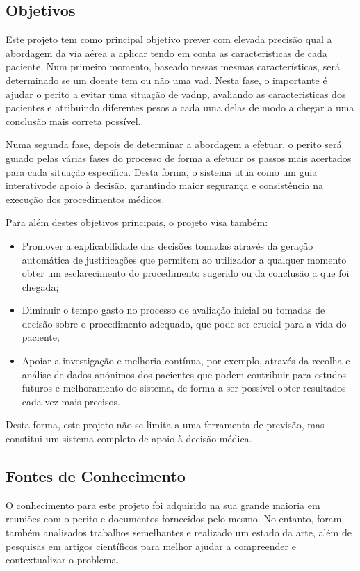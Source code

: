 \documentclass[a4paper,12pt,twoside]{article}
\begin{document}
    \subsection{Objetivos}
    Este projeto tem como principal objetivo prever com elevada precisão qual a abordagem da via aérea a aplicar tendo em conta as caracteristicas de cada paciente. Num primeiro momento, baseado nessas mesmas características, será determinado se um doente tem ou não uma \gls{vad}. Nesta fase, o importante é ajudar o perito a evitar uma situação de \gls{vadnp}, avaliando as caracteristicas dos pacientes e atribuindo diferentes pesos a cada uma delas de modo a chegar a uma conclusão mais correta possível.
    
    Numa segunda fase, depois de determinar a abordagem a efetuar, o perito será guiado pelas várias fases do processo de forma a efetuar os passos mais acertados para cada situação específica. Desta forma, o sistema atua como um guia interativode apoio à decisão, garantindo maior segurança e consistência na execução dos procedimentos médicos.

    Para além destes objetivos principais, o projeto visa também:
    \begin{itemize}
        \item Promover a explicabilidade das decisões tomadas através da geração automática de justificações que permitem ao utilizador a qualquer momento obter um esclarecimento do procedimento sugerido ou da conclusão a que foi chegada;
        \item Diminuir o tempo gasto no processo de avaliação inicial ou tomadas de decisão sobre o procedimento adequado, que pode ser crucial para a vida do paciente;
        \item Apoiar a investigação e melhoria contínua, por exemplo, através da recolha e análise de dados anónimos dos pacientes que podem contribuir para estudos futuros e melhoramento do sistema, de forma a ser possível obter resultados cada vez mais precisos.
    \end{itemize}

    Desta forma, este projeto não se limita a uma ferramenta de previsão, mas constitui um sistema completo de apoio à decisão médica.

    \subsection{Fontes de Conhecimento}

    O conhecimento para este projeto foi adquirido na sua grande maioria em reuniões com o perito e documentos fornecidos pelo mesmo. No entanto, foram também analisados trabalhos semelhantes e realizado um estado da arte, além de pesquisas em artigos científicos para melhor ajudar a compreender e contextualizar o problema.
\end{document}
